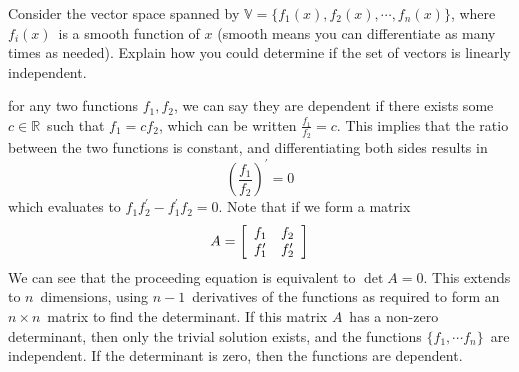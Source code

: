 \documentclass{letter}
\newcommand{\?}{\stackrel{?}{=}}
\newcommand\Ans[2][]{%
   \leavevmode\noindent
   {
       \begin{mdframed}[backgroundcolor=blue!10]
       #2
       \end{mdframed}
   }
}
\newenvironment{Mat}[1]{%
  \left[\begin{array}{*{#1}{r}}
}{%
  \end{array}\right]
}
\begin{document}
\begin{enumerate}
\begin{enumerate}[label=(\alph*)]
{        Consider the vector space spanned by $\mathbb{V}=\{f_1(x),f_2(x),\cdots,f_n(x)\}$, where $f_i(x)$\ is a smooth function of $x$
        (smooth means you can differentiate as many times as needed).  
        Explain how you could determine if the set of vectors is linearly independent.
    }
    \Ans{
        for any two functions $f_1,f_2$, we can say they are dependent if there exists some $c\in\mathbb{R}$\ such that $f_1=cf_2$, 
        which can be written $\frac{f_1}{f_2}=c$.  
        This implies that the ratio between the two functions is constant, and differentiating both sides results in
        \[\left(\frac{f_1}{f_2}\right)^\prime = 0\]
        which evaluates to $f_1f_2^\prime-f_1^\prime f_2=0$.  Note that if we form a matrix
        \[A=\begin{Mat}{2} f_1 & f_2 \\ f_1^\prime & f_2^\prime \end{Mat}\]
        We can see that the proceeding equation is equivalent to $\det A=0$.  
        This extends to $n$\ dimensions, using $n-1$\ derivatives of the functions as required to form an $n\times n$\ matrix to find the determinant.  If this matrix $A$\ has a non-zero determinant, then only the trivial solution exists, and the functions $\{f_1,\cdots f_n\}$\ are independent.  If the determinant is zero, then the functions are dependent.
        
}
\end{enumerate}
\end{enumerate}
\end{document}
